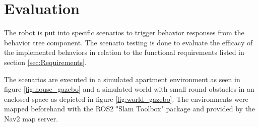\chapter{Evaluation}
\label{cha:ergebnisse}

The robot is put into specific scenarios to trigger behavior responses from the behavior tree component. The scenario testing is done to evaluate the efficacy of the implemented behaviors in relation to the functional requirements listed in section \ref{sec:Requirements}.

The scenarios are executed in a simulated apartment environment as seen in figure \ref{fig:house_gazebo} and a simulated world with small round obstacles in an enclosed space as depicted in figure \ref{fig:world_gazebo}. The environments were mapped beforehand with the ROS2 "Slam Toolbox" package and provided by the Nav2 map server. 

